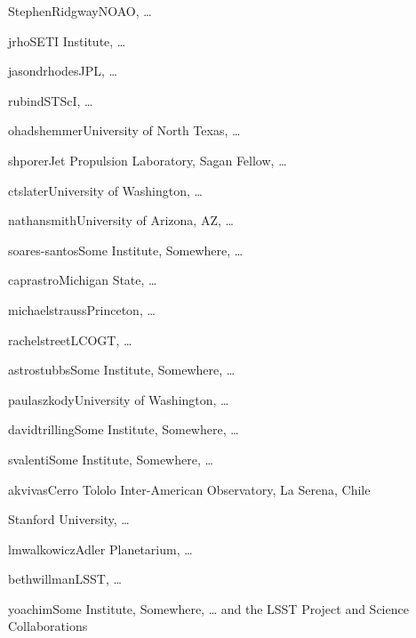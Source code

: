 \author{Stephen Ridgway}{StephenRidgway}{NOAO, \ldots}
\author{Jeonghee Rho}{jrho}{SETI Institute, \ldots}
\author{Jason Rhodes}{jasondrhodes}{JPL, \ldots}
\author{David Rubin}{rubind}{STScI, \ldots}
\author{Ohad Shemmer}{ohadshemmer}{University of North Texas, \ldots}
\author{Avi Shporer}{shporer}{Jet Propulsion Laboratory, Sagan Fellow, \ldots}
\author{Colin Slater}{ctslater}{University of Washington, \ldots}
\author{Nathan Smith}{nathansmith}{University of Arizona, AZ, \ldots}
\author{Marcelles Soares-Santos}{soares-santos}{Some Institute, Somewhere, \ldots}
\author{Jay Strader}{caprastro}{Michigan State, \ldots}
\author{Michael Strauss}{michaelstrauss}{Princeton, \ldots}
\author{Rachel Street}{rachelstreet}{LCOGT, \ldots}
\author{Christopher Stubbs}{astrostubbs}{Some Institute, Somewhere, \ldots}
\author{Paula Szkody}{paulaszkody}{University of Washington, \ldots}
\author{David Trilling}{davidtrilling}{Some Institute, Somewhere, \ldots}
\author{Stefano Valenti}{svalenti}{Some Institute, Somewhere, \ldots}
\author{Kathy Vivas}{akvivas}{Cerro Tololo Inter-American Observatory, La Serena, Chile}
\author{Robert Wagoner}{}{Stanford University, \ldots}
\author{Lucianne Walkowicz}{lmwalkowicz}{Adler Planetarium, \ldots}
\author{Beth Willman}{bethwillman}{LSST, \ldots}
\author{Peter Yoachim}{yoachim}{Some Institute, Somewhere, \ldots}
{and the LSST Project and Science Collaborations}
